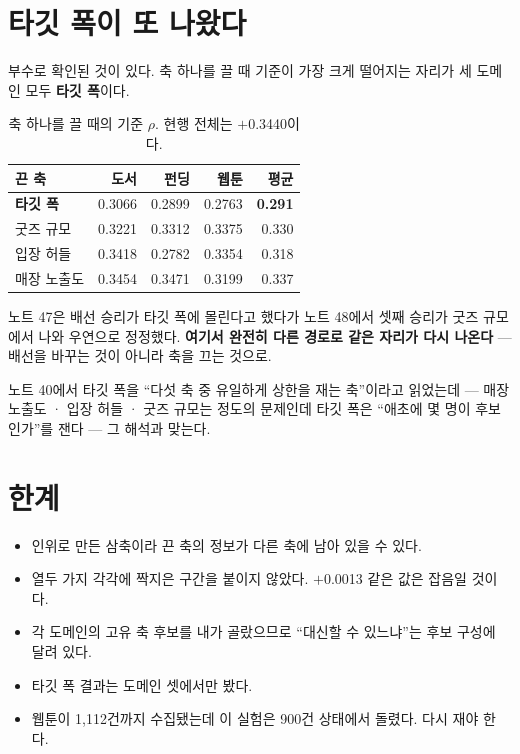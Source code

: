 \documentclass[10pt]{article}
\begin{document}
\section{타깃 폭이 또 나왔다}

부수로 확인된 것이 있다. 축 하나를 끌 때 기준이 가장 크게 떨어지는 자리가
세 도메인 모두 \textbf{타깃 폭}이다.

\begin{table}[t]
\centering\tsize
\caption{축 하나를 끌 때의 기준 $\rho$. 현행 전체는 $+$0.3440이다.}
\begin{tabular}{lrrrr}
\toprule
끈 축 & 도서 & 펀딩 & 웹툰 & 평균 \\
\midrule
\textbf{타깃 폭} & 0.3066 & 0.2899 & 0.2763 & \textbf{0.291} \\
굿즈 규모 & 0.3221 & 0.3312 & 0.3375 & 0.330 \\
입장 허들 & 0.3418 & 0.2782 & 0.3354 & 0.318 \\
매장 노출도 & 0.3454 & 0.3471 & 0.3199 & 0.337 \\
\bottomrule
\end{tabular}
\end{table}

노트 47은 배선 승리가 타깃 폭에 몰린다고 했다가 노트 48에서 셋째 승리가 굿즈
규모에서 나와 우연으로 정정했다. \textbf{여기서 완전히 다른 경로로 같은 자리가
다시 나온다} --- 배선을 바꾸는 것이 아니라 축을 끄는 것으로.


노트 40에서 타깃 폭을 ``다섯 축 중 유일하게 상한을 재는 축''이라고 읽었는데
--- 매장 노출도 · 입장 허들 · 굿즈 규모는 정도의 문제인데 타깃 폭은 ``애초에
몇 명이 후보인가''를 잰다 --- 그 해석과 맞는다.

\section{한계}

\begin{itemize}[leftmargin=1.1em,itemsep=0.15em]
\item 인위로 만든 삼축이라 끈 축의 정보가 다른 축에 남아 있을 수 있다.
\item 열두 가지 각각에 짝지은 구간을 붙이지 않았다. $+$0.0013 같은 값은
      잡음일 것이다.
\item 각 도메인의 고유 축 후보를 내가 골랐으므로 ``대신할 수 있느냐''는 후보
      구성에 달려 있다.
\item 타깃 폭 결과는 도메인 셋에서만 봤다.
\item 웹툰이 1,112건까지 수집됐는데 이 실험은 900건 상태에서 돌렸다. 다시
      재야 한다.
\end{itemize}
\end{document}
